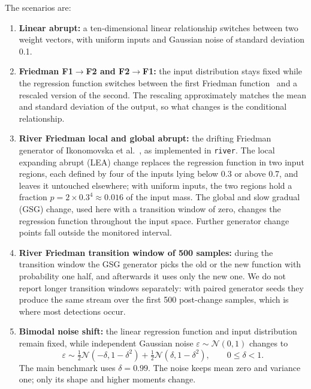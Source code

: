 \documentclass[preprint,12pt]{elsarticle}
\begin{document}
The scenarios are:
\begin{enumerate}
\item \textbf{Linear abrupt:} a ten-dimensional linear relationship switches between two weight vectors, with uniform inputs and Gaussian noise of standard deviation 0.1.
\item \textbf{Friedman F1$\to$F2 and F2$\to$F1:} the input distribution stays fixed while the regression function switches between the first Friedman function~\cite{friedman1991multivariate} and a rescaled version of the second. The rescaling approximately matches the mean and standard deviation of the output, so what changes is the conditional relationship.
\item \textbf{River Friedman local and global abrupt:} the drifting Friedman generator of Ikonomovska et al.~\cite{ikonomovska2011learning}, as implemented in \texttt{river}. The local expanding abrupt (LEA) change replaces the regression function in two input regions, each defined by four of the inputs lying below 0.3 or above 0.7, and leaves it untouched elsewhere; with uniform inputs, the two regions hold a fraction $p=2\times0.3^4\approx0.016$ of the input mass. The global and slow gradual (GSG) change, used here with a transition window of zero, changes the regression function throughout the input space. Further generator change points fall outside the monitored interval.
\item \textbf{River Friedman transition window of 500 samples:} during the transition window the GSG generator picks the old or the new function with probability one half, and afterwards it uses only the new one. We do not report longer transition windows separately: with paired generator seeds they produce the same stream over the first 500 post-change samples, which is where most detections occur.
\item \textbf{Bimodal noise shift:} the linear regression function and input distribution remain fixed, while independent Gaussian noise $\varepsilon\sim\mathcal N(0,1)$ changes to
\begin{equation}\label{eq:mixture}
\varepsilon\sim\tfrac12\mathcal N(-\delta,1-\delta^2)+\tfrac12\mathcal N(\delta,1-\delta^2),\qquad0\leq\delta<1.
\end{equation}
The main benchmark uses $\delta=0.99$. The noise keeps mean zero and variance one; only its shape and higher moments change.
\end{enumerate}
\end{document}
